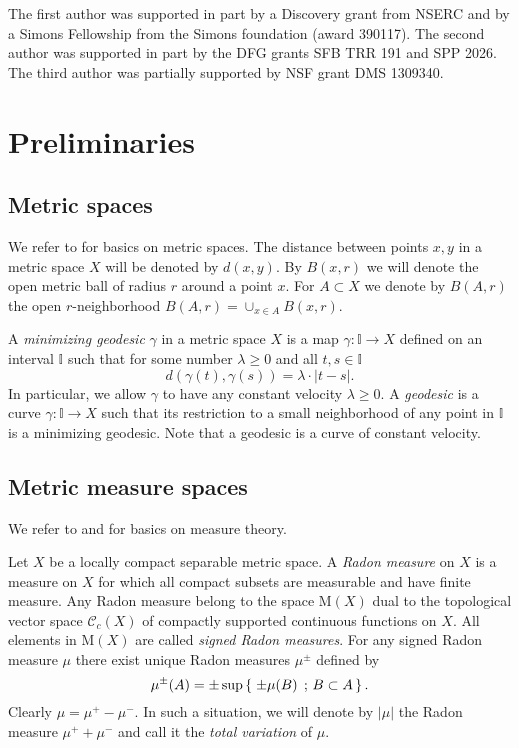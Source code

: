 \documentclass[12pt,leqno,intlimits]{amsart}
\numberwithin{equation}{section}
\theoremstyle{definition}
\theoremstyle{remark}
\def\:{\colon}
\newcommand*{\set}[2]{\left\{\,\left.{#1}\vphantom{#2}\,\right.;\,{#2}\,\right\}}
\begin{document}
The first author was supported in part by a Discovery grant from NSERC and by a Simons Fellowship from the Simons foundation (award 390117).
The second author was supported in part by the DFG grants SFB TRR 191 and SPP 2026.
The third author was partially supported by NSF grant DMS 1309340.

\section{Preliminaries} \label{sec:prelim}
\subsection{Metric spaces}
We refer to \cite{BBI01} for basics on metric spaces.
The distance between points $x,y$ in a metric space $X$ will be denoted by $d(x,y)$.
By $B(x,r)$ we will denote the open metric ball of radius $r$ around a point $x$. For $A\subset X$
we denote by $B (A,r)$ the open $r$-neighborhood $B (A,r) =\cup _{x\in A} B (x,r)$.

A \emph {minimizing geodesic} $\gamma$ in a metric space $X$ is a map $\gamma \: \mathbb I\to X$ defined on an interval $\mathbb I$ such that for some number $\lambda \geq 0$ and all $t,s\in \mathbb I$
$$ d(\gamma (t),\gamma (s)) =\lambda \cdot |t-s|.$$
In particular, we allow $\gamma$ to have any constant velocity $\lambda \geq 0$.
A \emph{geodesic} is a curve $\gamma\: \mathbb I\to X$ such that its restriction to a small neighborhood of any point in $\mathbb I$ is a minimizing geodesic.
Note that a geodesic is a curve of constant velocity.

\subsection{Metric measure spaces}
We refer to \cite{Federer} and \cite{Evans} for basics on measure theory.

Let $X$ be a locally compact separable metric space.
A \emph{Radon measure} on $X$ is a measure on $X$ for which all compact subsets are measurable and have finite measure.
Any Radon measure belong to the space $\mathrm M(X)$ dual to the topological vector space $\mathcal C_c (X)$ of compactly supported continuous functions on $X$.
All elements in $\mathrm M(X)$ are called \emph{signed Radon measures}.
{\color{red}
For any signed Radon measure $\mu$ there exist unique Radon measures $\mu^{\pm}$ defined by
\[\mu^\pm(A)=\pm\sup\set{\pm\mu(B)}{B\subset A}.\]
Clearly $\mu =\mu ^+- \mu ^-$.
}
In such a situation, we will denote by $|\mu |$ the Radon measure $\mu ^+ +\mu ^-$ and call it the \emph{total variation} of $\mu$.
\end{document}
